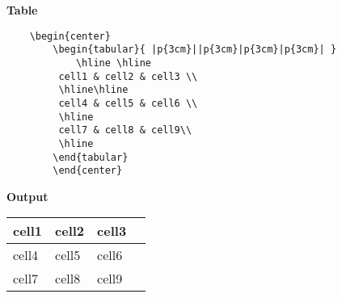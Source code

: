 \documentclass[12pt]{amsart}
\theoremstyle{definition}
\theoremstyle{remark}
\begin{document}
\textbf{Table}
\begin{verbatim}
    \begin{center}
        \begin{tabular}{ |p{3cm}||p{3cm}|p{3cm}|p{3cm}| }
            \hline \hline
         cell1 & cell2 & cell3 \\ 
         \hline\hline
         cell4 & cell5 & cell6 \\ 
         \hline 
         cell7 & cell8 & cell9\\
         \hline  
        \end{tabular}
        \end{center}
\end{verbatim}
\textbf{Output}
\begin{center}
    \begin{tabular}{ |p{3cm}||p{3cm}|p{3cm}|p{3cm}| }
        \hline \hline
     cell1 & cell2 & cell3 \\ 
     \hline\hline
     cell4 & cell5 & cell6 \\ 
     \hline 
     cell7 & cell8 & cell9\\
     \hline  
    \end{tabular}
    \end{center}
\end{document}
